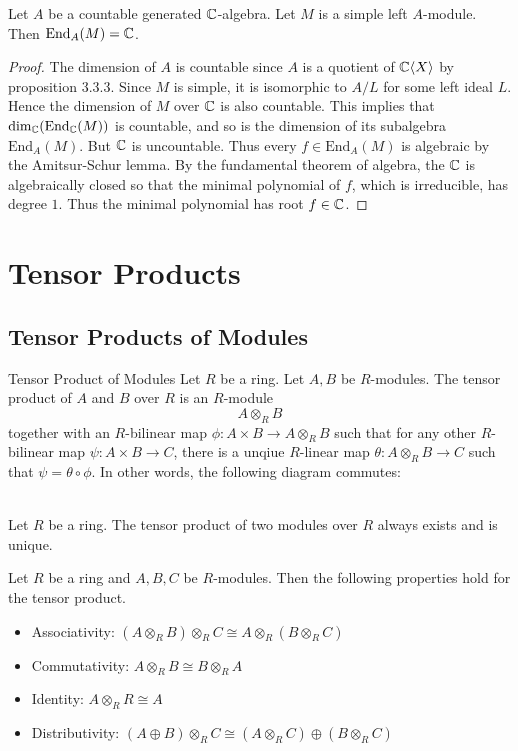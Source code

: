 \documentclass[a4paper]{article}
\begin{document}
\begin{crl}{}{} Let $A$ be a countable generated $\mathbb{C}$-algebra. Let $M$ is a simple left $A$-module. Then $\text{End}_A(M)=\mathbb{C}$. \tcbline
\begin{proof}
The dimension of $A$ is countable since $A$ is a quotient of $\mathbb{C}\langle X\rangle$ by proposition 3.3.3. Since $M$ is simple, it is isomorphic to $A/L$ for some left ideal $L$. Hence the dimension of $M$ over $\mathbb{C}$ is also countable. This implies that $\dim_{\mathbb{C}}(\text{End}_{\mathbb{C}}(M))$ is countable, and so is the dimension of its subalgebra $\text{End}_A(M)$. But $\mathbb{C}$ is uncountable. Thus every $f\in\text{End}_A(M)$ is algebraic by the Amitsur-Schur lemma. By the fundamental theorem of algebra, the $\mathbb{C}$ is algebraically closed so that the minimal polynomial of $f$, which is irreducible, has degree $1$. Thus the minimal polynomial has root $f\in\mathbb{C}$. 
\end{proof}
\end{crl}


\pagebreak
\section{Tensor Products}
\subsection{Tensor Products of Modules}
\begin{defn}{Tensor Product of Modules}{} Let $R$ be a ring. Let $A,B$ be $R$-modules. The tensor product of $A$ and $B$ over $R$ is an $R$-module $$A\otimes_R B$$ together with an $R$-bilinear map $\phi:A\times B\to A\otimes_RB$ such that for any other $R$-bilinear map $\psi:A\times B\to C$, there is a unqiue $R$-linear map $\theta:A\otimes_RB\to C$ such that $\psi=\theta\circ\phi$. In other words, the following diagram commutes: \\~\\
\end{defn}

\begin{lmm}{}{} Let $R$ be a ring. The tensor product of two modules over $R$ always exists and is unique. 
\end{lmm}

\begin{prp}{}{} Let $R$ be a ring and $A,B,C$ be $R$-modules. Then the following properties hold for the tensor product. 
\begin{itemize}
\item Associativity: $(A\otimes_RB)\otimes_RC\cong A\otimes_R(B\otimes_RC)$
\item Commutativity: $A\otimes_R B\cong B\otimes_RA$
\item Identity: $A\otimes_RR\cong A$
\item Distributivity: $(A\oplus B)\otimes_R C\cong(A\otimes_RC)\oplus(B\otimes_RC)$
\end{itemize}
\end{prp}
\end{document}
